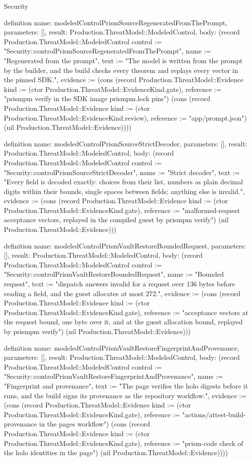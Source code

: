 \begin{lexlean}{Security}
\begin{semanticmodule}
definition{
  name: modeledControlPrismSourceRegeneratedFromThePrompt,
  parameters: [],
  result: Production.ThreatModel::ModeledControl,
  body: (record Production.ThreatModel::ModeledControl {control := "Security::controlPrismSourceRegeneratedFromThePrompt", name := "Regenerated from the prompt", text := "The model is written from the prompt by the builder, and the build checks every theorem and replays every vector in the pinned SDK.", evidence := (cons (record Production.ThreatModel::Evidence {kind := (ctor Production.ThreatModel::EvidenceKind.gate), reference := "prismpm verify in the SDK image prismpm.lock pins"}) (cons (record Production.ThreatModel::Evidence {kind := (ctor Production.ThreatModel::EvidenceKind.review), reference := "app/prompt.json"}) (nil Production.ThreatModel::Evidence)))})
}

definition{
  name: modeledControlPrismSourceStrictDecoder,
  parameters: [],
  result: Production.ThreatModel::ModeledControl,
  body: (record Production.ThreatModel::ModeledControl {control := "Security::controlPrismSourceStrictDecoder", name := "Strict decoder", text := "Every field is decoded exactly: choices from their list, numbers as plain decimal digits within their bounds, single spaces between fields; anything else is invalid.", evidence := (cons (record Production.ThreatModel::Evidence {kind := (ctor Production.ThreatModel::EvidenceKind.gate), reference := "malformed-request acceptance vectors, replayed in the compiled guest by prismpm verify"}) (nil Production.ThreatModel::Evidence))})
}

definition{
  name: modeledControlPrismVaultRestoreBoundedRequest,
  parameters: [],
  result: Production.ThreatModel::ModeledControl,
  body: (record Production.ThreatModel::ModeledControl {control := "Security::controlPrismVaultRestoreBoundedRequest", name := "Bounded request", text := "dispatch answers invalid for a request over 136 bytes before reading a field, and the guest allocates at most 272.", evidence := (cons (record Production.ThreatModel::Evidence {kind := (ctor Production.ThreatModel::EvidenceKind.gate), reference := "acceptance vectors at the request bound, one byte over it, and at the guest allocation bound, replayed by prismpm verify"}) (nil Production.ThreatModel::Evidence))})
}

definition{
  name: modeledControlPrismVaultRestoreFingerprintAndProvenance,
  parameters: [],
  result: Production.ThreatModel::ModeledControl,
  body: (record Production.ThreatModel::ModeledControl {control := "Security::controlPrismVaultRestoreFingerprintAndProvenance", name := "Fingerprint and provenance", text := "The page verifies the holo digests before it runs, and the build signs its provenance as the repository workflow.", evidence := (cons (record Production.ThreatModel::Evidence {kind := (ctor Production.ThreatModel::EvidenceKind.gate), reference := "actions/attest-build-provenance in the pages workflow"}) (cons (record Production.ThreatModel::Evidence {kind := (ctor Production.ThreatModel::EvidenceKind.gate), reference := "prism-code check of the holo identities in the page"}) (nil Production.ThreatModel::Evidence)))})
}


\end{semanticmodule}
\end{lexlean}
